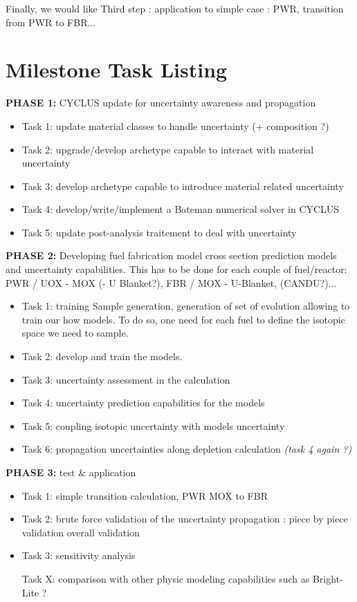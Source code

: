 \documentclass[dvips,12pt]{article}
\begin{document}
Finally, we would like
Third step : application to simple case : PWR, transition from PWR to FBR...

\pagebreak
\section{Milestone Task Listing}

\noindent\textbf{PHASE 1:} CYCLUS update for uncertainty awareness and propagation

\begin{itemize}
\item Task 1: update material classes to handle uncertainty (+ composition ?)
\item Task 2: upgrade/develop archetype capable to interact with material uncertainty
\item Task 3: develop archetype capable to introduce material related uncertainty
\item Task 4: develop/write/implement a Bateman numerical solver in CYCLUS
\item Task 5: update post-analysis traitement to deal with uncertainty  
\end{itemize}
 
\noindent\textbf{PHASE 2:} Developing fuel fabrication model cross section prediction models and uncertainty capabilities. This has to be done for each couple of fuel/reactor: PWR / UOX - MOX (- U Blanket?), FBR / MOX - U-Blanket, (CANDU?)...
\begin{itemize}
\item Task 1: training Sample generation, generation of set of evolution allowing to train our how models.
To do so, one need for each fuel to define the isotopic space we need to sample. 
\item Task 2: develop and train the models.
\item Task 3: uncertainty assessment in the calculation
\item Task 4: uncertainty prediction capabilities for the models
\item Task 5: coupling isotopic uncertainty with models uncertainty
\item Task 6: propagation uncertainties along depletion calculation \textit{(task 4 again ?)}
\end{itemize}
 
\noindent\textbf{PHASE 3:} test \& application
\begin{itemize}
\item Task 1: simple transition calculation, PWR MOX to FBR
\item Task 2: brute force validation of the uncertainty propagation :
piece by piece validation
overall validation
\item Task 3: sensitivity analysis

Task X: comparison with other physic modeling capabilities such as Bright-Lite ?
\end{itemize}
 
\end{document}
